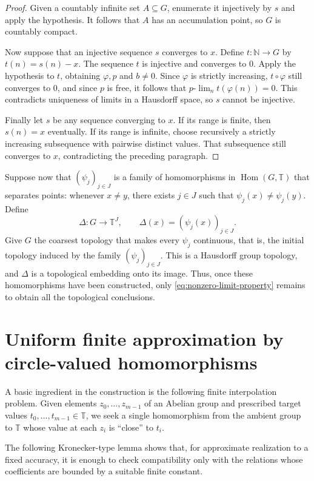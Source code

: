 \documentclass[11pt]{amsart}
\theoremstyle{definition}
\newcommand{\T}{\mathbb T}
\newcommand{\N}{\mathbb N}
\newcommand{\Hom}{\operatorname{Hom}}
\begin{document}
\begin{proof}
Given a countably infinite set $A\subseteq G$, enumerate it injectively by
$s$ and apply the hypothesis.  It follows that $A$ has an accumulation point,
so $G$ is countably compact.

Now suppose that an injective sequence $s$ converges to $x$.  Define
$t:\N\to G$ by $t(n)=s(n)-x$.
The sequence $t$ is injective and converges to $0$.  Apply the hypothesis
to $t$, obtaining $\varphi,p$ and $b\neq0$.  Since $\varphi$ is strictly
increasing, $t\circ\varphi$ still converges to $0$, and since $p$ is
free, it follows that $p\text{-}\lim_n t(\varphi(n))=0$.  This contradicts
uniqueness of limits in a Hausdorff space, so $s$ cannot be injective.

Finally let $s$ be any sequence converging to $x$.  If its range is finite,
then
$s(n)=x$ eventually.  If its range is infinite, choose recursively a
strictly increasing subsequence with pairwise distinct values.  That
subsequence still converges to $x$, contradicting the preceding paragraph.
\end{proof}

Suppose now that $(\psi_j)_{j\in J}$ is a family of homomorphisms in
$\Hom(G,\T)$ that separates points: whenever $x\neq y$, there exists $j\in J$
such that $\psi_j(x)\neq\psi_j(y)$.  Define
\[
 \Delta:G\longrightarrow\T^J,
 \qquad \Delta(x)=(\psi_j(x))_{j\in J}.
\]
Give $G$ the coarsest topology that makes every $\psi_j$ continuous, that is,
the initial topology induced by the family $(\psi_j)_{j\in J}$. This is a
Hausdorff group topology, and $\Delta$ is a topological embedding
onto its image.  Thus, once these homomorphisms have been constructed, only
\eqref{eq:nonzero-limit-property} remains to obtain all the topological
conclusions.


\section{Uniform finite approximation by circle-valued homomorphisms}

A basic ingredient in the construction is the
following finite interpolation problem.  Given elements
$z_0,\ldots,z_{m-1}$ of an Abelian group and prescribed target values
$t_0,\ldots,t_{m-1}\in\T$, we seek a single homomorphism from the ambient
group to $\T$ whose value at each $z_i$ is ``close'' to $t_i$.

The following Kronecker-type lemma shows
that, for approximate realization to a fixed accuracy, it is enough to check
compatibility only with the relations whose coefficients are bounded by a
suitable finite constant.
\end{document}
